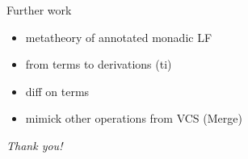 \documentclass[ignorenonframetext,red]{beamer}
\begin{document}
\begin{frame}{Further work}
  \begin{itemize}
  \item metatheory of annotated monadic LF
  \item from terms to derivations (\textsf{ti})
  \item \textsf{diff} on terms
  \item mimick other operations from VCS (\textsf{Merge})
  \end{itemize}
  \vspace{2em}
  \pause
  \begin{center}
    \Large\em Thank you!
  \end{center}
\end{frame}
\end{document}
